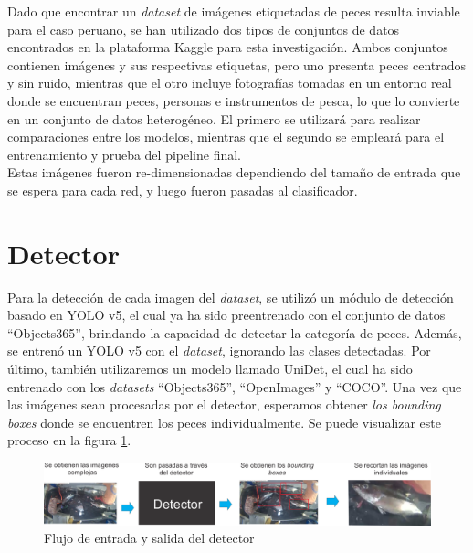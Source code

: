 Dado que encontrar un \textit{dataset} de imágenes etiquetadas de peces resulta 
inviable para el caso peruano, se han utilizado dos tipos de conjuntos de datos 
encontrados en la plataforma Kaggle para esta investigación. Ambos conjuntos contienen 
imágenes y sus respectivas etiquetas, pero uno presenta peces centrados y sin ruido, 
mientras que el otro incluye fotografías tomadas en un entorno real donde se encuentran 
peces, personas e instrumentos de pesca, lo que lo convierte en un conjunto de datos 
heterogéneo. El primero se utilizará para realizar comparaciones entre los modelos, 
mientras que el segundo se empleará para el entrenamiento y prueba del pipeline final.
\\

Estas imágenes fueron re-dimensionadas dependiendo del tamaño de entrada que se espera 
para cada red, y luego fueron pasadas al clasificador.

\section{Detector}
Para la detección de cada imagen del \textit{dataset}, se utilizó un módulo de detección 
basado en YOLO v5, el cual ya ha sido preentrenado con el conjunto de datos ``Objects365'', 
brindando la capacidad de detectar la categoría de peces. Además, se entrenó un YOLO v5 con 
el \textit{dataset}, ignorando las clases detectadas. Por último, también utilizaremos un 
modelo llamado UniDet, el cual ha sido entrenado con los \textit{datasets} ``Objects365'', 
``OpenImages'' y ``COCO''.  Una vez que las imágenes sean procesadas por el detector, 
esperamos obtener \textit{los bounding boxes} donde se encuentren los peces individualmente. 
Se puede visualizar este proceso en la figura \ref{fig:detector_pez}.
\begin{figure}[h!]
\includegraphics[width=1\textwidth]{images/detector_pez.png}
\caption{Flujo de entrada y salida del detector }
\label{fig:detector_pez}
\end{figure}



